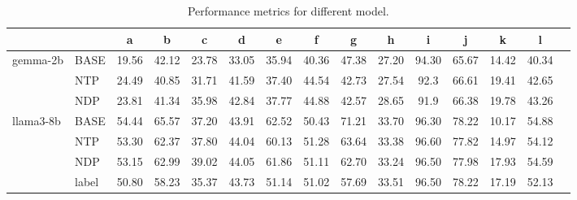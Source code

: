 \documentclass{article}
\begin{document}
\begin{table}[htbp]
 \centering
\begin{tabular}{ll c c c c c c c c c c c c c} %
\toprule
& & a & b & c & d & e & f & g  &h & i & j & k & l \\
\midrule
\multirow{3}{*}{gemma-2b} 
& BASE & 19.56 & 42.12 & 23.78 & 33.05 & 35.94 & 40.36 & 47.38 & 27.20 & 94.30 & 65.67 & 14.42 & 40.34 \\
& NTP & 24.49 & 40.85 & 31.71 & 41.59 & 37.40 & 44.54 & 42.73 & 27.54 & 92.3 & 66.61 & 19.41 & 42.65 \\
& NDP & 23.81 & 41.34 & 35.98 & 42.84 & 37.77 & 44.88 & 42.57 & 28.65 & 91.9 & 66.38 & 19.78 & 43.26 \\
\midrule
\multirow{4}{*}{llama3-8b}
& BASE & 54.44 & 65.57 & 37.20 & 43.91 & 62.52 & 50.43 & 71.21 & 33.70 & 96.30 & 78.22 & 10.17 & 54.88 \\
& NTP & 53.30 & 62.37 & 37.80 & 44.04 & 60.13 & 51.28 & 63.64 & 33.38 & 96.60 & 77.82 & 14.97 & 54.12 \\
& NDP & 53.15 & 62.99 & 39.02 & 44.05 & 61.86 & 51.11 & 62.70 & 33.24 & 96.50 & 77.98 & 17.93 & 54.59 \\
& label & 50.80 & 58.23 & 35.37 & 43.73 & 51.14 & 51.02 & 57.69 & 33.51 & 96.50 & 78.22 & 17.19 & 52.13 \\
\bottomrule
\end{tabular}
\caption{Performance metrics for different model.}
\label{tab:performance}
\end{table}
\end{document}
